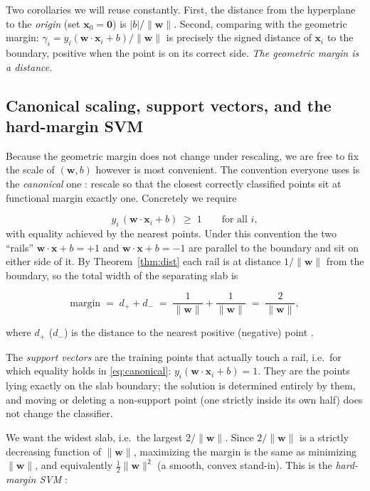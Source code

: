 Two corollaries we will reuse constantly. First, the distance from the
hyperplane to the \emph{origin} (set $\mathbf{x}_0 = \mathbf{0}$) is
$|b|/\|\mathbf{w}\|$. Second, comparing with the geometric margin:
$\gamma_i = y_i(\mathbf{w}\cdot\mathbf{x}_i+b)/\|\mathbf{w}\|$ is precisely
the signed distance of $\mathbf{x}_i$ to the boundary, positive when the
point is on its correct side. \emph{The geometric margin is a distance.}

\subsection{Canonical scaling, support vectors, and the hard-margin SVM}

Because the geometric margin does not change under rescaling, we are free
to fix the scale of $(\mathbf{w}, b)$ however is most convenient. The
convention everyone uses is the \emph{canonical} one
\citep{burges1998}: rescale so that the closest correctly classified
points sit at functional margin exactly one. Concretely we require

\begin{equation}
\label{eq:canonical}
  y_i\,(\mathbf{w}\cdot\mathbf{x}_i + b) \;\ge\; 1 \qquad\text{for all }i,
\end{equation}
with equality achieved by the nearest points. Under this convention the
two ``rails'' $\mathbf{w}\cdot\mathbf{x}+b = +1$ and
$\mathbf{w}\cdot\mathbf{x}+b = -1$ are parallel to the boundary and sit
on either side of it. By Theorem~\ref{thm:dist} each rail is at distance
$1/\|\mathbf{w}\|$ from the boundary, so the total width of the
separating slab is

\[
  \text{margin} \;=\; d_+ + d_- \;=\; \frac{1}{\|\mathbf{w}\|} + \frac{1}{\|\mathbf{w}\|}
  \;=\; \frac{2}{\|\mathbf{w}\|},
\]

where $d_+$ ($d_-$) is the distance to the nearest positive (negative)
point \citep{burges1998}.

\begin{definition}
The \emph{support vectors} are the training points that actually touch a
rail, i.e.\ for which equality holds in \eqref{eq:canonical}:
$y_i(\mathbf{w}\cdot\mathbf{x}_i+b)=1$. They are the points lying exactly
on the slab boundary; the solution is determined entirely by them, and
moving or deleting a non-support point (one strictly inside its own half)
does not change the classifier.
\end{definition}

We want the widest slab, i.e.\ the largest $2/\|\mathbf{w}\|$. Since
$2/\|\mathbf{w}\|$ is a strictly decreasing function of $\|\mathbf{w}\|$,
maximizing the margin is the same as minimizing $\|\mathbf{w}\|$, and
equivalently $\tfrac12\|\mathbf{w}\|^2$ (a smooth, convex stand-in). This
is the \emph{hard-margin SVM} \citep{boser1992, vapnik, burges1998}:

